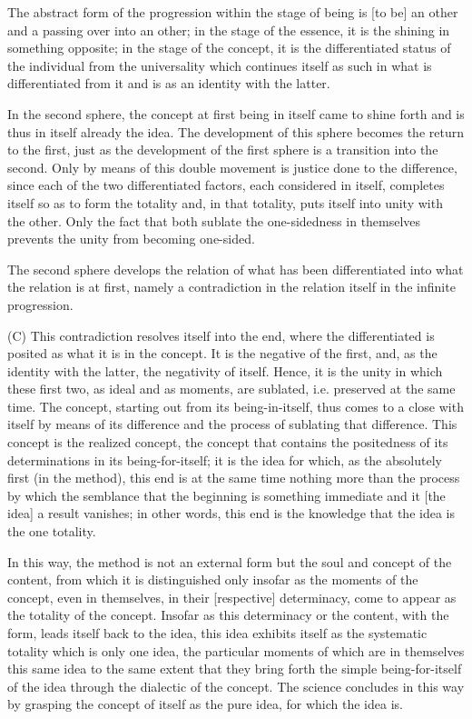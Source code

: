 The abstract form of the progression within the stage of being is
[to be] an other and a passing over into an other;
in the stage of the essence, it is the shining in something opposite;
in the stage of the concept, it is the differentiated status
of the individual from the universality which continues itself as such
in what is differentiated from it and is as an identity with the latter.

In the second sphere, the concept at first being in itself came to
shine forth and is thus in itself already the idea.
The development of this sphere becomes the return to the first,
just as the development of the first sphere is a transition into the second.
Only by means of this double movement is justice done to the difference,
since each of the two differentiated factors, each considered in itself,
completes itself so as to form the totality and, in that totality,
puts itself into unity with the other.
Only the fact that both sublate the one-sidedness
in themselves prevents the unity from becoming one-sided.

The second sphere develops the relation of what has been differentiated
into what the relation is at first, namely a contradiction in the relation itself
in the infinite progression.

(C) This contradiction resolves itself into the end,
where the differentiated is posited as what it is in the concept.
It is the negative of the first, and, as the identity with the latter,
the negativity of itself.
Hence, it is the unity in which these first two, as ideal and as moments,
are sublated, i.e. preserved at the same time.
The concept, starting out from its being-in-itself, thus comes to a close
with itself by means of its difference and the process of sublating that difference.
This concept is the realized concept,
the concept that contains the positedness
of its determinations in its being-for-itself;
it is the idea for which, as the absolutely first (in the method),
this end is at the same time nothing more than the process by which
the semblance that the beginning is something immediate and
it [the idea] a result vanishes;
in other words, this end is the knowledge that the idea is the one totality.

In this way, the method is not an external form but
the soul and concept of the content,
from which it is distinguished only insofar as
the moments of the concept, even in themselves,
in their [respective] determinacy,
come to appear as the totality of the concept.
Insofar as this determinacy or the content, with the form,
leads itself back to the idea, this idea exhibits itself
as the systematic totality which is only one idea,
the particular moments of which are in themselves this same idea
to the same extent that they bring forth the simple being-for-itself
of the idea through the dialectic of the concept.
The science concludes in this way by grasping the concept of
itself as the pure idea, for which the idea is.

